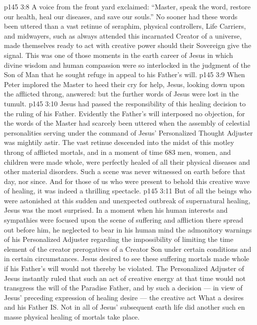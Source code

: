 \vs p145 3:8 A voice from the front yard exclaimed: “Master, speak the word, restore our health, heal our diseases, and save our souls.” No sooner had these words been uttered than a vast retinue of seraphim, physical controllers, Life Carriers, and midwayers, such as always attended this incarnated Creator of a universe, made themselves ready to act with creative power should their Sovereign give the signal. This was one of those moments in the earth career of Jesus in which divine wisdom and human compassion were so interlocked in the judgment of the Son of Man that he sought refuge in appeal to his Father’s will.
\vs p145 3:9 When Peter implored the Master to heed their cry for help, Jesus, looking down upon the afflicted throng, answered:  but the further words of Jesus were lost in the tumult.
\vs p145 3:10 Jesus had passed the responsibility of this healing decision to the ruling of his Father. Evidently the Father’s will interposed no objection, for the words of the Master had scarcely been uttered when the assembly of celestial personalities serving under the command of Jesus’ Personalized Thought Adjuster was mightily astir. The vast retinue descended into the midst of this motley throng of afflicted mortals, and in a moment of time 683 men, women, and children were made whole, were perfectly healed of all their physical diseases and other material disorders. Such a scene was never witnessed on earth before that day, nor since. And for those of us who were present to behold this creative wave of healing, it was indeed a thrilling spectacle.
\vs p145 3:11 \pc But of all the beings who were astonished at this sudden and unexpected outbreak of supernatural healing, Jesus was the most surprised. In a moment when his human interests and sympathies were focused upon the scene of suffering and affliction there spread out before him, he neglected to bear in his human mind the admonitory warnings of his Personalized Adjuster regarding the impossibility of limiting the time element of the creator prerogatives of a Creator Son under certain conditions and in certain circumstances. Jesus desired to see these suffering mortals made whole if his Father’s will would not thereby be violated. The Personalized Adjuster of Jesus instantly ruled that such an act of creative energy at that time would not transgress the will of the Paradise Father, and by such a decision --- in view of Jesus’ preceding expression of healing desire --- the creative act  What a  desires and his Father  IS. Not in all of Jesus’ subsequent earth life did another such en masse physical healing of mortals take place.
